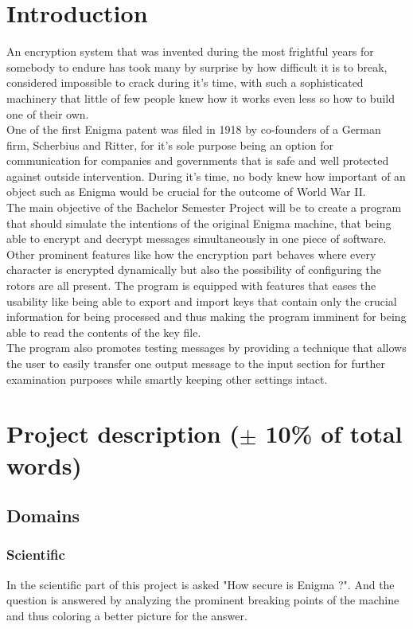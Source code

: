 \documentclass[conference,compsoc]{IEEEtran}
\begin{document}
\section{Introduction}
An encryption system that was invented during the most frightful years for somebody to endure has took many by surprise by how difficult it is to break, considered impossible to crack during it's time, with such a sophisticated machinery that little of few people knew how it works even less so how to build one of their own.\\
One of the first Enigma patent was filed in 1918 by co-founders of a German firm, Scherbius and Ritter, for it's sole purpose being an option for communication for companies and governments that is safe and well protected against outside intervention. During it's time, no body knew how important of an object such as Enigma would be crucial for the outcome of World War II.\\
The main objective of the Bachelor Semester Project will be to create a program that should simulate the intentions of the original Enigma machine, that being able to encrypt and decrypt messages simultaneously in one piece of software.
Other prominent features like how the encryption part behaves where every character is encrypted dynamically but also the possibility of configuring the rotors are all present. The program is equipped with features that eases the usability like being able to export and import keys that contain only the crucial information for being processed and thus making the program imminent for being able to read the contents of the key file.\\
The program also promotes testing messages by providing a technique that allows the user to easily transfer one output message to the input section for further examination purposes while smartly keeping other settings intact.\\


\section{Project description ($\pm$ 10\% of total words) }
\subsection{Domains}
\subsubsection{Scientific }
In the scientific part of this project is asked "How secure is Enigma ?". And the question is answered by analyzing the prominent breaking points of the machine and thus coloring a better picture for the answer.
\end{document}
